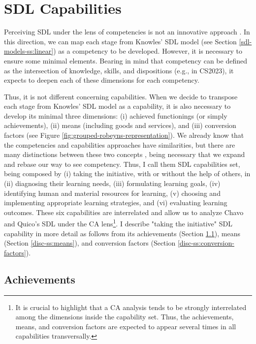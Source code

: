 \section{SDL Capabilities}
\label{disc-sec:sdl-capabilities}

Perceiving \gls{SDL} under the lens of competencies is not an innovative approach \cite{patterson:2002,morris:2019,colomer:2021}. In this direction, we can map each stage from Knowles' \gls{SDL} model (see Section \ref{sdl-models-ss:linear}) as a competency to be developed. However, it is necessary to ensure some minimal elements. Bearing in mind that competency can be defined as the intersection of knowledge, skills, and dispositions (e.g.,  in \acrfull{CS2023}), it expects to deepen each of these dimensions for each competency.

Thus, it is not different concerning capabilities. When we decide to transpose each stage from Knowles' \gls{SDL} model as a capability, it is also necessary to develop its minimal three dimensions: (i) achieved functionings (or simply achievements), (ii) means (including goods and services), and (iii) conversion factors (see Figure \ref{fig:grouped-robeyns-representation}).
We already know that the competencies and capabilities approaches have similarities, but there are many distinctions between these two concepts \cite{lozano:2012}, being necessary that we expand and rebase our way to see competency. Thus, I call them \gls{SDL} capabilities set, being composed by (i) taking the initiative, with or without the help of others, in (ii) diagnosing their learning needs, (iii) formulating learning goals, (iv) identifying human and material resources for learning, (v) choosing and implementing appropriate learning strategies, and (vi) evaluating learning outcomes. These six capabilities are interrelated and allow us to analyze Chavo and Quico’s \gls{SDL} under the \acrfull{CA} lens\footnote{It is crucial to highlight that a \gls{CA} analysis tends to be strongly interrelated among the dimensions inside the capability set. Thus, the achievements, means, and conversion factors are expected to appear several times in all capabilities transversally.}. I describe "taking the initiative" \gls{SDL} capability in more detail as follows from its achievements (Section \ref{disc-ss:achievements}), means (Section \ref{disc-ss:means}), and conversion factors (Section \ref{disc-ss:conversion-factors}).

\subsection{Achievements}
\label{disc-ss:achievements}

